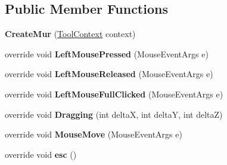 \subsection*{Public Member Functions}
\begin{DoxyCompactItemize}
\item 
\hypertarget{class_interface_graphique_1_1_tools_1_1_create_mur_abeb4c3641b9c6677ecc4fb9e7bdbcb6b}{}{\bfseries Create\+Mur} (\hyperlink{class_interface_graphique_1_1_tools_1_1_tool_context}{Tool\+Context} context)\label{class_interface_graphique_1_1_tools_1_1_create_mur_abeb4c3641b9c6677ecc4fb9e7bdbcb6b}

\item 
\hypertarget{class_interface_graphique_1_1_tools_1_1_create_mur_a79a1a1f1865df9234e4bd1415ed6b52f}{}override void {\bfseries Left\+Mouse\+Pressed} (Mouse\+Event\+Args e)\label{class_interface_graphique_1_1_tools_1_1_create_mur_a79a1a1f1865df9234e4bd1415ed6b52f}

\item 
\hypertarget{class_interface_graphique_1_1_tools_1_1_create_mur_a663d5c347bf63a1324605eb552c58a19}{}override void {\bfseries Left\+Mouse\+Released} (Mouse\+Event\+Args e)\label{class_interface_graphique_1_1_tools_1_1_create_mur_a663d5c347bf63a1324605eb552c58a19}

\item 
\hypertarget{class_interface_graphique_1_1_tools_1_1_create_mur_affaacf9919134693a0fc44fe246d4b8c}{}override void {\bfseries Left\+Mouse\+Full\+Clicked} (Mouse\+Event\+Args e)\label{class_interface_graphique_1_1_tools_1_1_create_mur_affaacf9919134693a0fc44fe246d4b8c}

\item 
\hypertarget{class_interface_graphique_1_1_tools_1_1_create_mur_a7ffdf69b104fda7ebdaef67f9ac03582}{}override void {\bfseries Dragging} (int delta\+X, int delta\+Y, int delta\+Z)\label{class_interface_graphique_1_1_tools_1_1_create_mur_a7ffdf69b104fda7ebdaef67f9ac03582}

\item 
\hypertarget{class_interface_graphique_1_1_tools_1_1_create_mur_abe8d1a32d61c3057490450bf9ff2b17c}{}override void {\bfseries Mouse\+Move} (Mouse\+Event\+Args e)\label{class_interface_graphique_1_1_tools_1_1_create_mur_abe8d1a32d61c3057490450bf9ff2b17c}

\item 
\hypertarget{class_interface_graphique_1_1_tools_1_1_create_mur_a26837d6c8d1fa58b035fb696396fc451}{}override void {\bfseries esc} ()\label{class_interface_graphique_1_1_tools_1_1_create_mur_a26837d6c8d1fa58b035fb696396fc451}

\end{DoxyCompactItemize}
